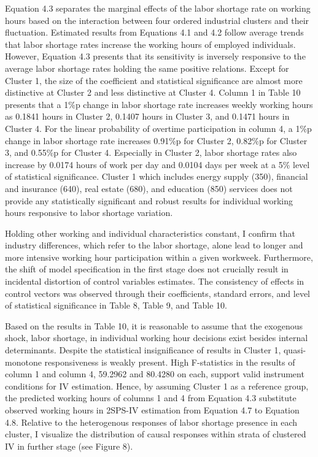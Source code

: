 \documentclass[
  12pt,
]{article}
\begin{document}
Equation 4.3 separates the marginal effects of the labor shortage rate
on working hours based on the interaction between four ordered
industrial clusters and their fluctuation. Estimated results from
Equations 4.1 and 4.2 follow average trends that labor shortage rates
increase the working hours of employed individuals. However, Equation
4.3 presents that its sensitivity is inversely responsive to the average
labor shortage rates holding the same positive relations. Except for
Cluster 1, the size of the coefficient and statistical significance are
almost more distinctive at Cluster 2 and less distinctive at Cluster 4.
Column 1 in Table 10 presents that a 1\%p change in labor shortage rate
increases weekly working hours as 0.1841 hours in Cluster 2, 0.1407
hours in Cluster 3, and 0.1471 hours in Cluster 4. For the linear
probability of overtime participation in column 4, a 1\%p change in
labor shortage rate increases 0.91\%p for Cluster 2, 0.82\%p for Cluster
3, and 0.55\%p for Cluster 4. Especially in Cluster 2, labor shortage
rates also increase by 0.0174 hours of work per day and 0.0104 days per
week at a 5\% level of statistical significance. Cluster 1 which
includes energy supply (350), financial and insurance (640), real estate
(680), and education (850) services does not provide any statistically
significant and robust results for individual working hours responsive
to labor shortage variation.

Holding other working and individual characteristics constant, I confirm
that industry differences, which refer to the labor shortage, alone lead
to longer and more intensive working hour participation within a given
workweek. Furthermore, the shift of model specification in the first
stage does not crucially result in incidental distortion of control
variables estimates. The consistency of effects in control vectors was
observed through their coefficients, standard errors, and level of
statistical significance in Table 8, Table 9, and Table 10.

Based on the results in Table 10, it is reasonable to assume that the
exogenous shock, labor shortage, in individual working hour decisions
exist besides internal determinants. Despite the statistical
insignificance of results in Cluster 1, quasi-monotone responsiveness is
weakly present. High F-statistics in the results of column 1 and column
4, 59.2962 and 80.4280 on each, support valid instrument conditions for
IV estimation. Hence, by assuming Cluster 1 as a reference group, the
predicted working hours of columns 1 and 4 from Equation 4.3 substitute
observed working hours in 2SPS-IV estimation from Equation 4.7 to
Equation 4.8. Relative to the heterogenous responses of labor shortage
presence in each cluster, I visualize the distribution of causal
responses within strata of clustered IV in further stage (see Figure 8).
\end{document}
